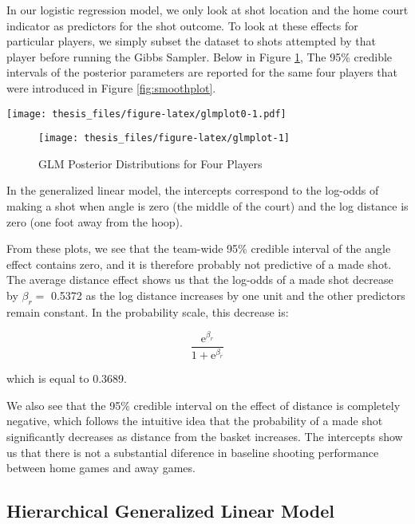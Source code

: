 \documentclass[12pt,twoside]{dukestatscithesis}
\theoremstyle{definition}
\theoremstyle{definition}
\theoremstyle{definition}
\theoremstyle{remark}
\begin{document}
In our logistic regression model, we only look at shot location and the
home court indicator as predictors for the shot outcome. To look at
these effects for particular players, we simply subset the dataset to
shots attempted by that player before running the Gibbs Sampler. Below
in Figure \ref{fig:glmplot}, The 95\% credible intervals of the
posterior parameters are reported for the same four players that were
introduced in Figure \ref{fig:smoothplot}.

\texttt{[image: thesis\_files/figure-latex/glmplot0-1.pdf]}
\begin{figure}

\hfill{}\texttt{[image: thesis\_files/figure-latex/glmplot-1]} 

\caption{GLM Posterior Distributions for Four Players}\label{fig:glmplot}
\end{figure}
In the generalized linear model, the intercepts correspond to the
log-odds of making a shot when angle is zero (the middle of the court)
and the log distance is zero (one foot away from the hoop).

From these plots, we see that the team-wide 95\% credible interval of
the angle effect contains zero, and it is therefore probably not
predictive of a made shot. The average distance effect shows us that the
log-odds of a made shot decrease by \(\beta_r =\) 0.5372 as the log
distance increases by one unit and the other predictors remain constant.
In the probability scale, this decrease is:

\[
\frac{\text{e}^{\beta_r}}{1 + \text{e}^{\beta_r}} 
\]

which is equal to 0.3689.

We also see that the 95\% credible interval on the effect of distance is
completely negative, which follows the intuitive idea that the
probability of a made shot significantly decreases as distance from the
basket increases. The intercepts show us that there is not a substantial
diference in baseline shooting performance between home games and away
games.

\subsection{Hierarchical Generalized Linear
Model}\label{hierarchical-generalized-linear-model-1}
\end{document}
